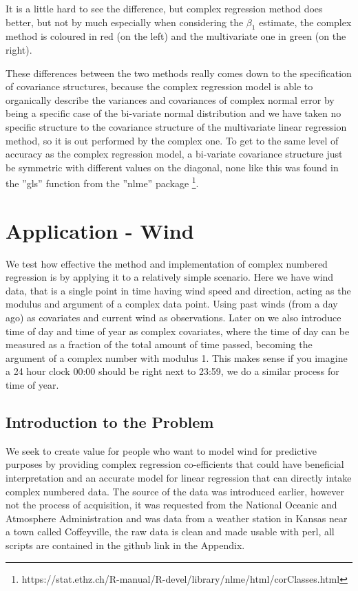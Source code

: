 \documentclass[honours,12pt]{unswthesis}
\numberwithin{equation}{section}
\begin{document}
\noindent It is a little hard to see the difference, but complex regression method does better, but not by much especially when considering the $\beta_{1}$ estimate, the complex method is coloured in red (on the left) and the multivariate one in green (on the right). \par

These differences between the two methods really comes down to the specification of covariance structures, because the complex regression model is able to organically describe the variances and covariances of complex normal error by being a specific case of the bi-variate normal distribution and we have taken no specific structure to the covariance structure of the multivariate linear regression method, so it is out performed by the complex one. To get to the same level of accuracy as the complex regression model, a bi-variate covariance structure just be symmetric with different values on the diagonal, none like this was found in the ''gls'' function from the ''nlme'' package \footnote{https://stat.ethz.ch/R-manual/R-devel/library/nlme/html/corClasses.html}.


\chapter{Application - Wind}


We test how effective the method and implementation of complex numbered regression is by applying it to a relatively simple scenario. Here we have wind data, that is a single point in time having wind speed and direction, acting as the modulus and argument of a complex data point. Using past winds (from a day ago) as covariates and current wind as observations. Later on we also introduce time of day and time of year as complex covariates, where the time of day can be measured as a fraction of the total amount of time passed, becoming the argument of a complex number with modulus 1. This makes sense if you imagine a 24 hour clock 00:00 should be right next to 23:59, we do a similar process for time of year.

\section{Introduction to the Problem}

We seek to create value for people who want to model wind for predictive purposes by providing complex regression co-efficients that could have beneficial interpretation and an accurate model for linear regression that can directly intake complex numbered data. The source of the data was introduced earlier, however not the process of acquisition, it was requested from the National Oceanic and Atmosphere Administration and was data from a weather station in Kansas near a town called Coffeyville, the raw data is clean and made usable with perl, all scripts are contained in the github link in the Appendix.
\end{document}
